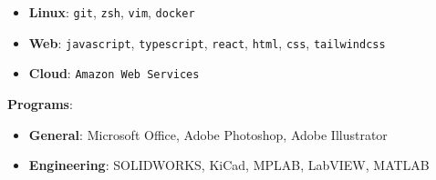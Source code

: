 \documentclass[a4paper, 10pt]{scrartcl}
\def\rightcolumnwidth{.675\textwidth}
\begin{document}
\begin{minipage}[b]{\rightcolumnwidth}
\begin{itemize}
		\item \textbf{Linux}:
		      \tabto{\tspace}
		      \texttt{git},
		      \texttt{zsh},
		      \texttt{vim},
		      \texttt{docker}

		\item \textbf{Web}:
		      \tabto{\tspace}
		      \texttt{javascript},
		      \texttt{typescript},
		      \texttt{react},
		      \texttt{html},
		      \texttt{css},
		      \texttt{tailwindcss}

		\item \textbf{Cloud}:
		      \tabto{\tspace}
		      \texttt{Amazon Web Services}
	\end{itemize}

	\textbf{Programs}:

	\begin{itemize}
		\item \textbf{General}:
		      \tabto{\tspace}
		      Microsoft Office,
		      Adobe Photoshop,
		      Adobe Illustrator

		\item \textbf{Engineering}:
		      \tabto{\tspace}
		      SOLIDWORKS,
		      KiCad,
		      MPLAB,
		      LabVIEW,
		      MATLAB
	\end{itemize}
	\vspace{-6.65pt}
\end{minipage}
\end{document}
